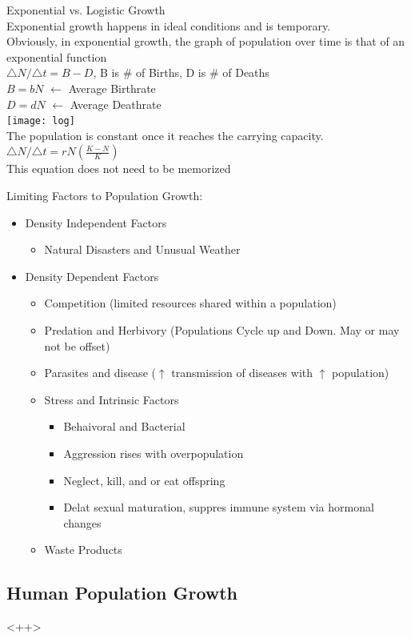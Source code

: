 \documentclass{article}
\begin{document}
Exponential vs. Logistic Growth\\
Exponential growth happens in ideal conditions and is temporary.\\
Obviously, in exponential growth, the graph of population over time is that of an exponential function\\
${\triangle N}/{\triangle t}=B-D$, B is \# of Births, D is \# of Deaths\\
$B=bN$ $\leftarrow$ Average Birthrate\\
$D=dN$ $\leftarrow$ Average Deathrate\\
\texttt{[image: log]}\\
The population is constant once it reaches the carrying capacity.\\
${\triangle N}/{\triangle t}=rN(\frac{K-N}{K})$\\
This equation does not need to be memorized

Limiting Factors to Population Growth:
\begin{itemize}
\item Density Independent Factors
\begin{itemize}
\item Natural Disasters and Unusual Weather
\end{itemize}
\item Density Dependent Factors
\begin{itemize}
\item Competition (limited resources shared within a population)
\item Predation and Herbivory (Populations Cycle up and Down. May or may not be offset)
\item Parasites and disease ($\uparrow$ transmission of diseases with $\uparrow$ population)
\item Stress and Intrinsic Factors
\begin{itemize}
\item Behaivoral and Bacterial
\item Aggression rises with overpopulation
\item Neglect, kill, and or eat offspring
\item Delat sexual maturation, suppres immune system via hormonal changes
\end{itemize}
\item Waste Products
\end{itemize}
\end{itemize}

\subsection{Human Population Growth}

<++>
\end{document}
